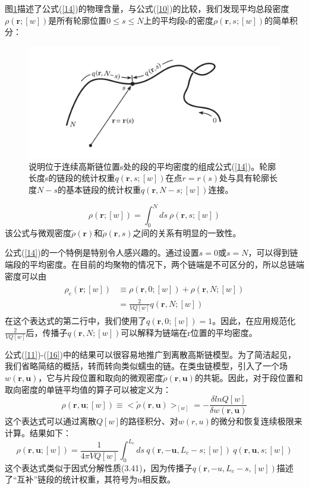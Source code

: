 图\ref{figure1}描述了公式(\ref{14})的物理含量，与公式(\ref{10})的比较，我们发现平均总段密度$\rho(\mathbf{r};[w])$是所有轮廓位置$0\le s\le N$上的平均段s的密度$\rho(\mathbf{r},s;[w])$的简单积分：

\begin{figure}[H]
\centering
\includegraphics[width=15cm]{./figures/32.png}
\caption{说明位于连续高斯链位置s处的段的平均密度的组成公式(\ref{14})。轮廓长度s的链段的统计权重$q(\mathbf{r},s;[w])$在点$r=r(s)$处与具有轮廓长度$N−s$的基本链段的统计权重$q(\mathbf{r},N−s;[w])$连接。}
\label{figure1}
\end{figure}

\begin{equation}\label{15}
\rho(\mathbf{r};[w])=\int_{0}^{N}ds~\rho(\mathbf{r},s;[w])
\end{equation}
该公式与微观密度$\tilde{\rho}(\mathbf{r})$和$\tilde{\rho}(\mathbf{r},s)$之间的关系有明显的一致性。

公式(\ref{14})的一个特例是特别令人感兴趣的。通过设置$s=0$或$s=N$，可以得到链端段的平均密度。在目前的均聚物的情况下，两个链端是不可区分的，所以总链端密度可以由
\begin{align}\label{16}
\begin{split}
\rho_e(\mathbf{r};[w])&\equiv \rho(\mathbf{r},0;[w])+\rho(\mathbf{r},N;[w])\\  &=\frac{2}{VQ[w]}q(\mathbf{r},N;[w])
\end{split}
\end{align}
在这个表达式的第二行中，我们使用了$q(\mathbf{r},0;[w])=1$。因此，在应用规范化$\frac{2}{VQ[w]}$后，传播子$q(\mathbf{r},N;[w])$可以解释为链端在r位置的平均密度。

公式(\ref{11})-(\ref{16})中的结果可以很容易地推广到离散高斯链模型。为了简洁起见，我们省略简结的概括，转而转向类似蠕虫的链。在类虫链模型，引入了一个场$w(\mathbf{r},\mathbf{u})$，它与片段位置和取向的微观密度$\tilde{\rho}(\mathbf{r},\mathbf{u})$的共轭。因此，对于段位置和取向密度的单链平均值的算子可以被定义为：
\begin{equation}\label{17}
\rho(\mathbf{r},\mathbf{u};[w])\equiv <\tilde{\rho}(\mathbf{r},\mathbf{u})>_{[w]}=-\frac{\delta lnQ[w]}{\delta w(\mathbf{r},\mathbf{u})}
\end{equation}
这个表达式可以通过离散$Q[w]$的路径积分、对$w(r,u)$的微分和恢复连续极限来计算。结果如下：
\begin{equation}\label{18}
\rho(\mathbf{r},\mathbf{u};[w])=\frac{1}{4\pi VQ[w]}\int_{0}^{L_c}ds~ q(\mathbf{r},-\mathbf{u},L_c-s;[w])~q(\mathbf{r},\mathbf{u},s;[w])
\end{equation}
这个表达式类似于因式分解性质(3.41)，因为传播子$q(\mathbf{r},-u,L_c-s,[w])$描述了“互补”链段的统计权重，其符号为u相反数。

